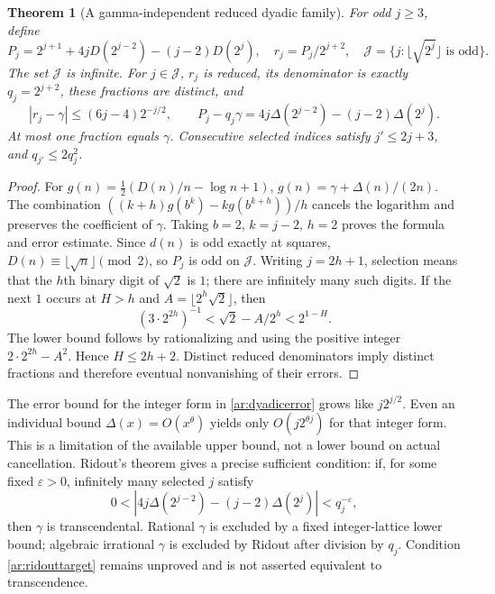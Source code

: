 \documentclass[11pt,a4paper]{article}
\newtheorem{theorem}{Theorem}[section]
\theoremstyle{definition}
\theoremstyle{remark}
\numberwithin{equation}{section}
\begin{document}
\begin{theorem}[A gamma-independent reduced dyadic family]
\label{ar:dyadic}
For odd $j\ge3$, define
\[
 P_j=2^{j+1}+4jD(2^{j-2})-(j-2)D(2^j),\quad
 r_j=P_j/2^{j+2},\quad
 \mathcal J=\{j:\lfloor\sqrt{2^j}\rfloor\text{ is odd}\}.
\]
The set $\mathcal J$ is infinite.  For $j\in\mathcal J$, $r_j$ is reduced,
its denominator is exactly $q_j=2^{j+2}$, these fractions are distinct, and
\begin{equation}\label{ar:dyadicerror}
 |r_j-\gamma|\le(6j-4)2^{-j/2},\qquad
 P_j-q_j\gamma=4j\Delta(2^{j-2})-(j-2)\Delta(2^j).
\end{equation}
At most one fraction equals $\gamma$.  Consecutive selected indices satisfy
$j'\le2j+3$, and $q_{j'}\le2q_j^2$.
\end{theorem}
\begin{proof}
For $g(n)=\tfrac12(D(n)/n-\log n+1)$,
$g(n)=\gamma+\Delta(n)/(2n)$.  The combination
$((k+h)g(b^k)-kg(b^{k+h}))/h$ cancels the logarithm and preserves the
coefficient of $\gamma$.  Taking $b=2$, $k=j-2$, $h=2$ proves the formula
and error estimate.  Since $d(n)$ is odd exactly at squares,
$D(n)\equiv\lfloor\sqrt n\rfloor\pmod2$, so $P_j$ is odd on
$\mathcal J$.  Writing $j=2h+1$, selection means that the $h$th binary
digit of $\sqrt2$ is $1$; there are infinitely many such digits.
If the next $1$ occurs at $H>h$ and $A=\lfloor2^h\sqrt2\rfloor$, then
\[
 (3\cdot2^{2h})^{-1}<\sqrt2-A/2^h<2^{1-H}.
\]
The lower bound follows by rationalizing and using the positive integer
$2\cdot2^{2h}-A^2$.  Hence $H\le2h+2$.  Distinct reduced denominators
imply distinct fractions and therefore eventual nonvanishing of their errors.
\end{proof}

The error bound for the integer form in \eqref{ar:dyadicerror} grows like
$j2^{j/2}$.  Even an individual bound $\Delta(x)=O(x^\theta)$ yields only
$O(j2^{\theta j})$ for that integer form.  This is a limitation of the
available upper bound, not a lower bound on actual cancellation.
Ridout's theorem \cite{ar:Ridout} gives a precise sufficient condition:
if, for some fixed $\varepsilon>0$, infinitely many selected $j$ satisfy
\begin{equation}\label{ar:ridouttarget}
 0<|4j\Delta(2^{j-2})-(j-2)\Delta(2^j)|<q_j^{-\varepsilon},
\end{equation}
then $\gamma$ is transcendental.  Rational $\gamma$ is excluded by a fixed
integer-lattice lower bound; algebraic irrational $\gamma$ is excluded by
Ridout after division by $q_j$.  Condition \eqref{ar:ridouttarget} remains
unproved and is not asserted equivalent to transcendence.
\end{document}
